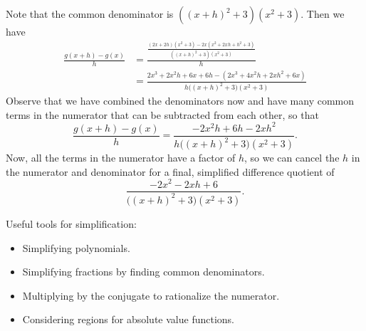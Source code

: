 \documentclass{ximera}
\begin{document}
\begin{example}
\begin{enumerate}
\begin{explanation}
 Note that the common denominator is $((x+h)^2+3)(x^2 + 3)$. Then we have
 \begin{align*}
  \frac{g(x+h) - g(x)}{h} &= \frac{\frac{(2x+2h)(x^2+3) - 2x(x^2+2xh+h^2+3)}{((x+h)^2+3)(x^2 + 3)}}{h} \\
  &= \frac{2x^3 +2x^2h + 6x + 6h - (2x^3 +4x^2h + 2xh^2 +6x)}{h\big((x+h)^2+3\big)(x^2 + 3)}
 \end{align*}
 Observe that we have combined the denominators now and have many common terms in the numerator that can be subtracted from each other, so that
 \begin{equation*}
 \frac{g(x+h) - g(x)}{h} = \frac{-2x^2h + 6h -2xh^2}{h\big((x+h)^2+3\big)(x^2 + 3)}.
\end{equation*}
%
Now, all the terms in the numerator have a factor of $h$, so we can cancel the $h$ in the numerator and denominator for a final, simplified difference quotient of
 \begin{equation*}
\frac{-2x^2-2xh + 6}{\big((x+h)^2+3\big)(x^2 + 3)}.
\end{equation*}
 \end{explanation}
  \end{enumerate}
\end{example}




\begin{summary}
Useful tools for simplification:
\begin{itemize}
\item Simplifying polynomials.
\item Simplifying fractions by finding common denominators.
\item Multiplying by the conjugate to rationalize the numerator.
\item Considering regions for absolute value functions. 
\end{itemize}\end{summary}
\end{document}
